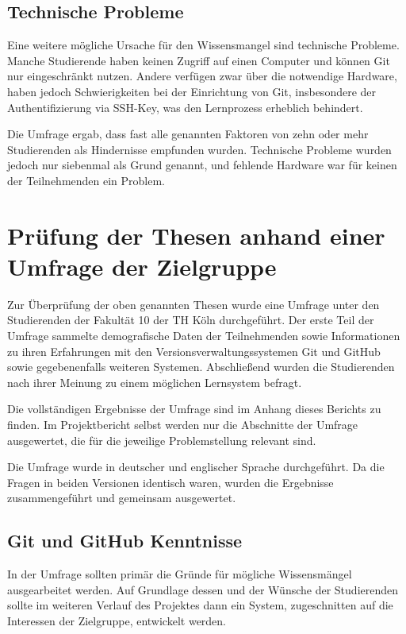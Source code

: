 \subsection{Technische Probleme}
Eine weitere mögliche Ursache für den Wissensmangel sind technische Probleme. Manche Studierende haben keinen Zugriff auf einen Computer und können Git nur eingeschränkt nutzen.
Andere verfügen zwar über die notwendige Hardware, haben jedoch Schwierigkeiten bei der Einrichtung von Git, insbesondere der Authentifizierung via SSH-Key, was den Lernprozess erheblich behindert.

Die Umfrage ergab, dass fast alle genannten Faktoren von zehn oder mehr Studierenden als Hindernisse empfunden wurden. Technische Probleme wurden jedoch nur siebenmal als Grund genannt, und fehlende Hardware war für keinen der Teilnehmenden ein Problem.

\section{Prüfung der Thesen anhand einer Umfrage der Zielgruppe}
\label{sec:survey}
Zur Überprüfung der oben genannten Thesen wurde eine Umfrage unter den Studierenden der Fakultät 10 der TH Köln durchgeführt.
Der erste Teil der Umfrage sammelte demografische Daten der Teilnehmenden sowie Informationen zu ihren Erfahrungen mit den Versionsverwaltungssystemen Git und GitHub sowie gegebenenfalls weiteren Systemen.
Abschließend wurden die Studierenden nach ihrer Meinung zu einem möglichen Lernsystem befragt.

Die vollständigen Ergebnisse der Umfrage sind im Anhang dieses Berichts zu finden. Im Projektbericht selbst werden nur die Abschnitte der Umfrage ausgewertet, die für die jeweilige Problemstellung relevant sind.

Die Umfrage wurde in deutscher und englischer Sprache durchgeführt. Da die Fragen in beiden Versionen identisch waren, wurden die Ergebnisse zusammengeführt und gemeinsam ausgewertet.

\subsection{Git und GitHub Kenntnisse}
In der Umfrage sollten primär die Gründe für mögliche Wissensmängel ausgearbeitet werden.
Auf Grundlage dessen und der Wünsche der Studierenden sollte im weiteren Verlauf des Projektes dann ein System, zugeschnitten auf die Interessen der Zielgruppe, entwickelt werden.

